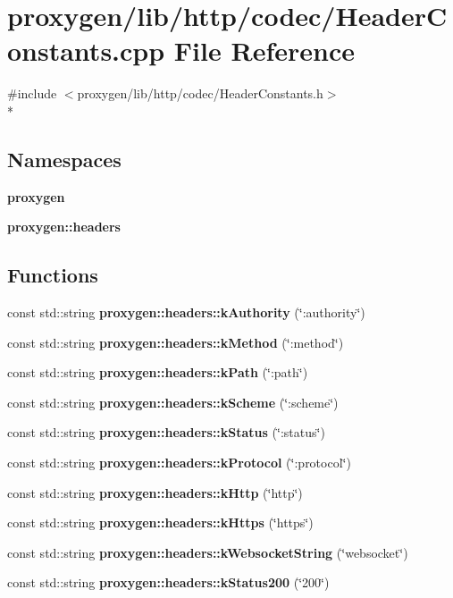 \section{proxygen/lib/http/codec/\+Header\+Constants.cpp File Reference}
\label{HeaderConstants_8cpp}
{\ttfamily \#include $<$proxygen/lib/http/codec/\+Header\+Constants.\+h$>$}\\*
\subsection*{Namespaces}
\begin{DoxyCompactItemize}
\item 
 {\bf proxygen}
\item 
 {\bf proxygen\+::headers}
\end{DoxyCompactItemize}
\subsection*{Functions}
\begin{DoxyCompactItemize}
\item 
const std\+::string {\bf proxygen\+::headers\+::k\+Authority} (\char`\"{}\+:authority\char`\"{})
\item 
const std\+::string {\bf proxygen\+::headers\+::k\+Method} (\char`\"{}\+:method\char`\"{})
\item 
const std\+::string {\bf proxygen\+::headers\+::k\+Path} (\char`\"{}\+:path\char`\"{})
\item 
const std\+::string {\bf proxygen\+::headers\+::k\+Scheme} (\char`\"{}\+:scheme\char`\"{})
\item 
const std\+::string {\bf proxygen\+::headers\+::k\+Status} (\char`\"{}\+:status\char`\"{})
\item 
const std\+::string {\bf proxygen\+::headers\+::k\+Protocol} (\char`\"{}\+:protocol\char`\"{})
\item 
const std\+::string {\bf proxygen\+::headers\+::k\+Http} (\char`\"{}http\char`\"{})
\item 
const std\+::string {\bf proxygen\+::headers\+::k\+Https} (\char`\"{}https\char`\"{})
\item 
const std\+::string {\bf proxygen\+::headers\+::k\+Websocket\+String} (\char`\"{}websocket\char`\"{})
\item 
const std\+::string {\bf proxygen\+::headers\+::k\+Status200} (\char`\"{}200\char`\"{})
\end{DoxyCompactItemize}
